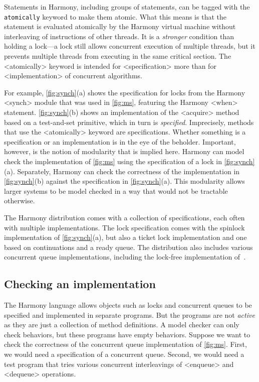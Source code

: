 \documentclass[twocolumn]{article}
\begin{document}
Statements in Harmony, including groups of statements, can be tagged with
the \texttt{atomically} keyword to make them atomic.  What this means
is that the statement is evaluated atomically by the Harmony virtual
machine without interleaving of instructions of other threads.  It is
a \emph{stronger} condition than holding a lock---a lock still allows
concurrent execution of multiple threads, but it prevents multiple
threads from executing in the same critical section.
The <{atomically}> keyword is intended for <{specification}> more than
for <{implementation}> of concurrent algorithms.

For example, \autoref{fig:synch}(a) shows the specification for locks
from the Harmony <{synch}> module that was used in \autoref{fig:ms},
featuring the Harmony <{when}> statement.
\autoref{fig:synch}(b) shows an implementation of the <{acquire}>
method based on a test-and-set primitive, which in turn is
\emph{specified}.
Imprecisely, methods that use the <{atomically}> keyword are specifications.
Whether something is a specification or an implementation is in the
eye of the beholder.
Important, however, is the notion of modularity that is implied here.
Harmony can model check the implementation of \autoref{fig:ms} using
the specification of a lock in \autoref{fig:synch}(a).
Separately, Harmony can check the correctness of the implementation in
\autoref{fig:synch}(b) against the specification in
\autoref{fig:synch}(a).  This modularity allows larger systems to
be model checked in a way that would not be tractable otherwise.

The Harmony distribution comes with a collection of specifications,
each often with multiple implementations.  The lock specification
comes with the spinlock implementation of \autoref{fig:synch}(a), but
also a ticket lock implementation and one based on continuations and
a ready queue.  The distribution also includes various concurrent
queue implementations, including the lock-free implementation
of~\cite{MS96}.

\subsection{Checking an implementation}

The Harmony language allows objects such as locks and concurrent queues
to be specified and implemented in separate programs.  But the programs
are not \emph{active} as they are just a collection of method definitions.
A model checker can only check behaviors, but these programs have empty
behaviors.
Suppose we want to check the correctness of the concurrent queue
implementation of \autoref{fig:ms}.  First, we would need a specification
of a concurrent queue.  Second, we would need a test program that tries
various concurrent interleavings of <{enqueue}> and <{dequeue}> operations.
\end{document}
